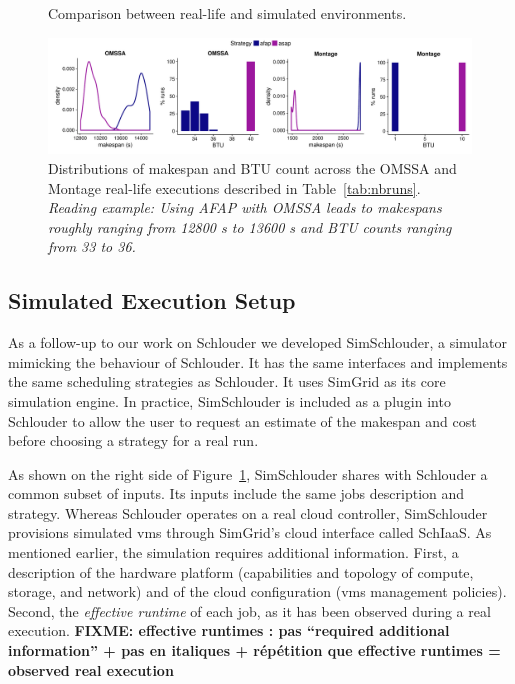 \documentclass[10pt,conference,compsocconf]{IEEEtran}
\begin{document}
\begin{figure}
	\resizebox{0.5\textwidth}{!}{%
		
	}%
	\caption{Comparison between real-life and simulated environments.}\label{fig:rs}
\end{figure}
\begin{figure}
	\centering
	\includegraphics[width=\textwidth]{gfx/real_plot.pdf}
	\caption[caption]{Distributions of makespan and BTU count across the OMSSA and 
	  Montage real-life executions described in Table~\ref{tab:nbruns}.\\ 
	  \textit{Reading example: Using AFAP with OMSSA leads to makespans 
	  roughly ranging from 12800 s to 13600 s and BTU counts ranging from 33 to 36.}
	  }
	\label{fig:realbrs}
\end{figure}

\subsection{Simulated Execution Setup}
As a follow-up  to our work on Schlouder we  developed SimSchlouder, a simulator
mimicking  the  behaviour  of  Schlouder. It has the same interfaces and implements  the  same  scheduling
strategies  as  Schlouder. It  uses  SimGrid  as its  core  simulation  engine.  In
practice, SimSchlouder  is included as  a plugin  into Schlouder to allow the
user to request an estimate of the makespan and cost before choosing a
strategy for a real run.

As  shown on  the right  side of  Figure~\ref{fig:rs}, SimSchlouder  shares with
Schlouder  a common  subset of  inputs.   Its inputs  include the  same jobs
description  and  strategy.    Whereas  Schlouder  operates  on   a  real  cloud
controller,  SimSchlouder   provisions  simulated  \acp{vm} through
SimGrid's cloud interface  called SchIaaS. As mentioned  earlier, the simulation
requires  additional information. First, a description of the hardware platform 
(capabilities and topology of compute, storage, and network) and of the cloud configuration
(\acp{vm} management policies). Second,  the \emph{effective runtime}
of each job, as it has been observed during a real execution.
\textbf{FIXME: effective runtimes : pas ``required additional information'' +
  pas en italiques + répétition que effective runtimes = observed real execution}
\end{document}
